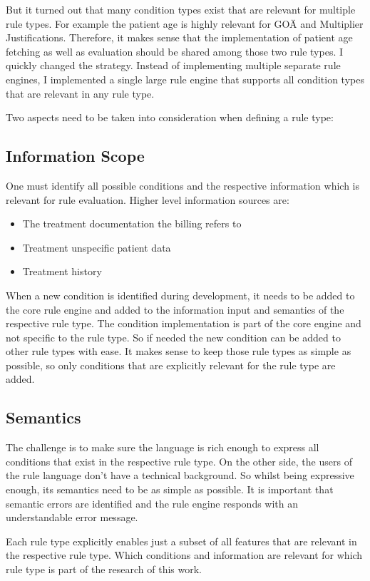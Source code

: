 But it turned out that many condition types exist that are relevant for multiple rule types.
For example the patient age is highly relevant for GOÄ and Multiplier Justifications.
Therefore, it makes sense that the implementation of patient age fetching as well as evaluation should be shared among those two rule types.
I quickly changed the strategy.
Instead of implementing multiple separate rule engines, I implemented a single large rule engine that supports all condition types that are relevant in any rule type.


Two aspects need to be taken into consideration when defining a rule type:

\subsection{Information Scope}
One must identify all possible conditions and the respective information which is relevant for rule evaluation.
Higher level information sources are:
\begin{itemize}
    \item The treatment documentation the billing refers to
    \item Treatment unspecific patient data
    \item Treatment history
\end{itemize}
When a new condition is identified during development, it needs to be added to the core rule engine and added to the information input and semantics of the respective rule type.
The condition implementation is part of the core engine and not specific to the rule type.
So if needed the new condition can be added to other rule types with ease.
It makes sense to keep those rule types as simple as possible, so only conditions that are explicitly relevant for the rule type are added.

\subsection{Semantics}
The challenge is to make sure the language is rich enough to express all conditions that exist in the respective rule type.
On the other side, the users of the rule language don't have a technical background.
So whilst being expressive enough, its semantics need to be as simple as possible.
It is important that semantic errors are identified and the rule engine responds with an understandable error message.

Each rule type explicitly enables just a subset of all features that are relevant in the respective rule type.
Which conditions and information are relevant for which rule type is part of the research of this work.

